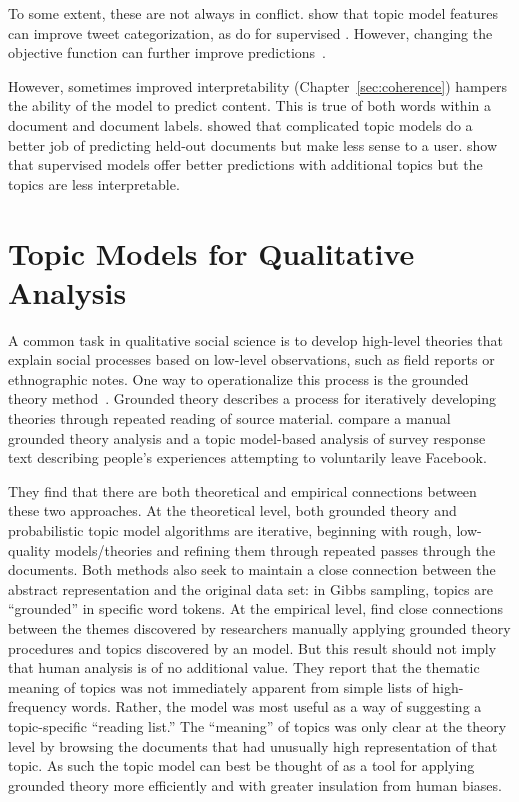 To some extent, these are not always in conflict.  \citet{ramage-10b}
show that topic model features can improve tweet categorization, as
do \citet{blei-07b} for supervised .  However, changing the
objective function can further improve predictions~\citep{zhu-09}.

However, sometimes improved interpretability
(Chapter~\ref{sec:coherence}) hampers the ability of the model to
predict content.  This is true of both words within a document and
document labels.  \citet{chang-09b} showed that complicated topic
models do a better job of predicting held-out documents but make less
sense to a user.  \citet{Nguyen-15:anchor} show that supervised models
offer better predictions with additional topics but the topics are
less interpretable.

\section{Topic Models for Qualitative Analysis}

A common task in qualitative social science is to develop high-level theories that explain social processes based on low-level observations, such as field reports or ethnographic notes.
One way to operationalize this process is the grounded theory method~\citep{glaser-67}.
Grounded theory describes a process for iteratively developing theories through repeated reading of source material.
\citet{baumer-17} compare a manual grounded theory analysis and a topic model-based analysis of survey response text describing people's experiences attempting to voluntarily leave Facebook.

They find that there are both theoretical and empirical connections between these two approaches.
At the theoretical level, both grounded theory and probabilistic topic model algorithms are iterative, beginning with rough, low-quality models/theories and refining them through repeated passes through the documents.
Both methods also seek to maintain a close connection between the abstract representation and the original data set: in Gibbs sampling, topics are ``grounded'' in specific word tokens.
At the empirical level, \citet{baumer-17} find close connections between the themes discovered by researchers manually applying grounded theory procedures and topics discovered by an  model.
But this result should not imply that human analysis is of no additional value.
They report that the thematic meaning of  topics was not immediately apparent from simple lists of high-frequency words.
Rather, the model was most useful as a way of suggesting a topic-specific ``reading list.''
The ``meaning'' of topics was only clear at the theory level by browsing the documents that had unusually high representation of that topic.
As such the topic model can best be thought of as a tool for applying grounded theory more efficiently and with greater insulation from human biases. 

